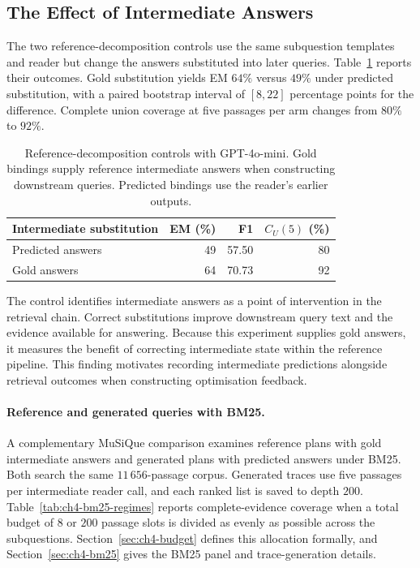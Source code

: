 \subsection{The Effect of Intermediate Answers}

The two reference-decomposition controls use the same subquestion templates
and reader but change the answers substituted into later queries.
Table~\ref{tab:ch4-bindings} reports their outcomes. Gold substitution yields
EM $64\%$ versus $49\%$ under predicted substitution, with a paired bootstrap
interval of $[8,22]$ percentage points for the difference. Complete union
coverage at five passages per arm changes from $80\%$ to $92\%$.

\begin{table}[htbp]
\centering
\caption{Reference-decomposition controls with GPT-4o-mini. Gold bindings
supply reference intermediate answers when constructing downstream queries.
Predicted bindings use the reader's earlier outputs.}
\label{tab:ch4-bindings}
\begin{tabular}{lrrr}
\hline
Intermediate substitution & EM (\%) & F1 & $C_U(5)$ (\%) \\
\hline
Predicted answers & 49 & 57.50 & 80 \\
Gold answers & 64 & 70.73 & 92 \\
\hline
\end{tabular}
\end{table}

The control identifies intermediate answers as a point of intervention in the
retrieval chain. Correct substitutions improve downstream query text and the
evidence available for answering. Because this experiment supplies gold
answers, it measures the benefit of correcting intermediate state within the
reference pipeline. This finding motivates recording intermediate predictions
alongside retrieval outcomes when constructing optimisation feedback.

\paragraph{Reference and generated queries with BM25.}
A complementary MuSiQue comparison examines reference plans with gold
intermediate answers and generated plans with predicted answers under BM25.
Both search the same $11\,656$-passage corpus. Generated traces use five
passages per intermediate reader call, and each ranked list is saved to depth
$200$. Table~\ref{tab:ch4-bm25-regimes} reports complete-evidence coverage
when a total budget of $8$ or $200$ passage slots is divided as evenly as
possible across the subquestions. Section~\ref{sec:ch4-budget} defines this
allocation formally, and Section~\ref{sec:ch4-bm25} gives the BM25 panel
and trace-generation details.

